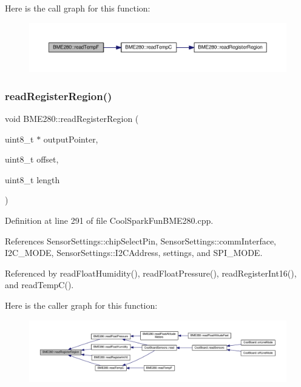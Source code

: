 Here is the call graph for this function\+:\nopagebreak
\begin{figure}[H]
\begin{center}
\leavevmode
\includegraphics[width=350pt]{df/dcf/class_b_m_e280_a9648b496f6b4700550782a715a98b3c7_cgraph}
\end{center}
\end{figure}
\mbox{\label{class_b_m_e280_aecca87c2c40a7f2bcabcea921bdc6124}} 
\subsubsection{\texorpdfstring{read\+Register\+Region()}{readRegisterRegion()}}
{\footnotesize\ttfamily void B\+M\+E280\+::read\+Register\+Region (\begin{DoxyParamCaption}\item[{uint8\+\_\+t $\ast$}]{output\+Pointer,  }\item[{uint8\+\_\+t}]{offset,  }\item[{uint8\+\_\+t}]{length }\end{DoxyParamCaption})}



Definition at line 291 of file Cool\+Spark\+Fun\+B\+M\+E280.\+cpp.



References Sensor\+Settings\+::chip\+Select\+Pin, Sensor\+Settings\+::comm\+Interface, I2\+C\+\_\+\+M\+O\+DE, Sensor\+Settings\+::\+I2\+C\+Address, settings, and S\+P\+I\+\_\+\+M\+O\+DE.



Referenced by read\+Float\+Humidity(), read\+Float\+Pressure(), read\+Register\+Int16(), and read\+Temp\+C().

Here is the caller graph for this function\+:\nopagebreak
\begin{figure}[H]
\begin{center}
\leavevmode
\includegraphics[width=350pt]{df/dcf/class_b_m_e280_aecca87c2c40a7f2bcabcea921bdc6124_icgraph}
\end{center}
\end{figure}
\mbox{\label{class_b_m_e280_a1bbd14c8591966df531e40085342ff71}} 
